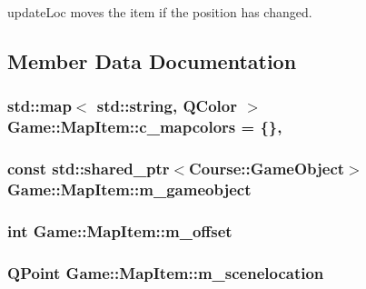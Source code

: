 update\-Loc moves the item if the position has changed. 



\subsection{Member Data Documentation}
\hypertarget{classGame_1_1MapItem_a2e9e5bfec64df70790559d7c2fe374b0}{
\subsubsection[{c\-\_\-mapcolors}]{\setlength{\rightskip}{0pt plus 5cm}std\-::map$<$ std\-::string, Q\-Color $>$ Game\-::\-Map\-Item\-::c\-\_\-mapcolors = \{\}\hspace{0.3cm}{\ttfamily [static]}, {\ttfamily [private]}}}\label{classGame_1_1MapItem_a2e9e5bfec64df70790559d7c2fe374b0}
\hypertarget{classGame_1_1MapItem_a501cc900c7d06991d795f9148650b070}{
\subsubsection[{m\-\_\-gameobject}]{\setlength{\rightskip}{0pt plus 5cm}const std\-::shared\-\_\-ptr$<${\bf Course\-::\-Game\-Object}$>$ Game\-::\-Map\-Item\-::m\-\_\-gameobject\hspace{0.3cm}{\ttfamily [private]}}}\label{classGame_1_1MapItem_a501cc900c7d06991d795f9148650b070}
\hypertarget{classGame_1_1MapItem_a4d704ac5bfc0a70926d8dfc51219e2cd}{
\subsubsection[{m\-\_\-offset}]{\setlength{\rightskip}{0pt plus 5cm}int Game\-::\-Map\-Item\-::m\-\_\-offset\hspace{0.3cm}{\ttfamily [private]}}}\label{classGame_1_1MapItem_a4d704ac5bfc0a70926d8dfc51219e2cd}
\hypertarget{classGame_1_1MapItem_a0f9e884f907244ada7432215fe01b2cd}{
\subsubsection[{m\-\_\-scenelocation}]{\setlength{\rightskip}{0pt plus 5cm}Q\-Point Game\-::\-Map\-Item\-::m\-\_\-scenelocation\hspace{0.3cm}{\ttfamily [private]}}}\label{classGame_1_1MapItem_a0f9e884f907244ada7432215fe01b2cd}
